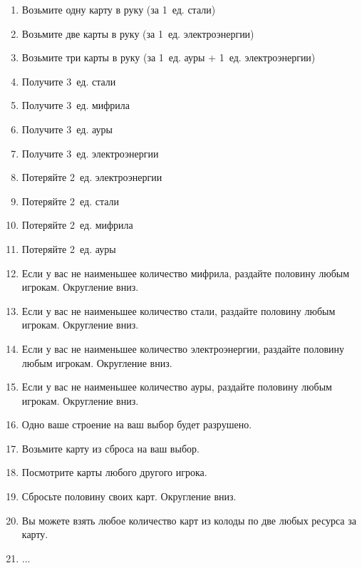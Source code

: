 \documentclass[a4paper,12pt]{article}
\begin{document}
  \begin{enumerate}
    \item Возьмите одну карту в руку (за 1~ед. стали)
    \item Возьмите две карты в руку (за 1~ед. электроэнергии)
    \item Возьмите три карты в руку (за 1~ед. ауры + 1~ед. электроэнергии)
    \item Получите 3~ед. стали
    \item Получите 3~ед. мифрила
    \item Получите 3~ед. ауры
    \item Получите 3~ед. электроэнергии
    \item Потеряйте 2~ед. электроэнергии
    \item Потеряйте 2~ед. стали
    \item Потеряйте 2~ед. мифрила
    \item Потеряйте 2~ед. ауры
    \item Если у вас не наименьшее количество мифрила, раздайте половину любым игрокам. Округление вниз.
    \item Если у вас не наименьшее количество стали, раздайте половину любым игрокам. Округление вниз.
    \item Если у вас не наименьшее количество электроэнергии, раздайте половину любым игрокам. Округление вниз.
    \item Если у вас не наименьшее количество ауры, раздайте половину любым игрокам. Округление вниз.
    \item Одно ваше строение на ваш выбор будет разрушено.
    \item Возьмите карту из сброса на ваш выбор.
    \item Посмотрите карты любого другого игрока.
    \item Сбросьте половину своих карт. Округление вниз.
    \item Вы можете взять любое количество карт из колоды по две любых ресурса за карту.
    \item ...
  \end{enumerate}
\end{document}
